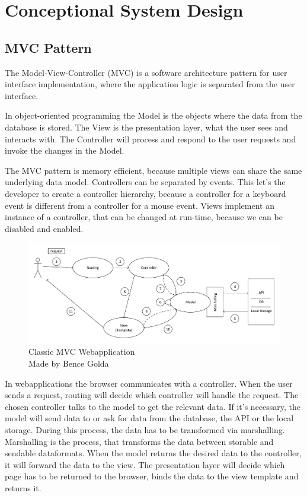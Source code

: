 \chapter{Conceptional System Design}


\section{MVC Pattern}

The Model-View-Controller (MVC) is a software architecture pattern for user interface implementation, where the application logic is separated from the user interface.

In object-oriented programming the Model is the objects where the data from the database is stored. The View is the presentation layer, what the user sees and interacts with. The Controller will process and respond to the user requests and invoke the changes in the Model. 

The MVC pattern is memory efficient, because multiple views can share the same underlying data model. Controllers can be separated by events. This let's the developer to create a controller hierarchy, because a controller for a keyboard event is different from a controller for a mouse event. Views implement an instance of a controller, that can be changed at run-time, because we can be disabled and enabled.


\begin{figure}[!ht]
	\includegraphics[width=\textwidth]{figures/klasszikus_mvc_webalkalmazas.pdf}
	\caption{Classic MVC Webapplication \\ Made by Bence Golda}
	\label{fig:classic-mvc-webapplication}
\end{figure}

In webapplications the browser communicates with a controller. When the user sends a request, routing will decide which controller will handle the request. The chosen controller talks to the model to get the relevant data. If it's necessary, the model will send data to or ask for data from the database, the API or the local storage. During this process, the data has to be transformed via marshalling. Marshalling is the process, that transforms the data between storable and sendable dataformats. When the model returns the desired data to the controller, it will forward the data to the view. The presentation layer will decide which page has to be returned to the browser, binds the data to the view template and returns it.

